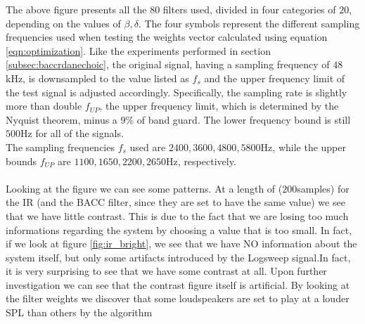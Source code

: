 The above figure presents all the $80$ filters used, divided in four categories of $20$, depending on the values of $\beta, \delta$. The four symbols represent the different sampling frequencies used when testing the weights vector calculated using equation \ref{eqn:optimization}. Like the experiments performed in section \ref{subsec:baccrdanechoic}, the original signal, having a sampling frequency of $48$kHz, is downsampled to the value listed as $f_s$ and the upper frequency limit of the test signal is adjusted accordingly. Specifically, the sampling rate is slightly more than double $f_{UP}$, the upper frequency limit, which is determined by the Nyquist theorem, minus a \tld$9\%$ of band guard. The lower frequency bound is still $500$Hz for all of the signals.
\\
The sampling frequencies $f_s$ used are $2400, 3600, 4800, 5800$Hz, while the upper bounds $f_{UP}$ are \tld$1100, 1650, 2200, 2650$Hz, respectively. 
\\
\\
Looking at the figure we can see some patterns. At a length of ($200$samples) for the IR (and the BACC filter, since they are set to have the same value) we see that we have little contrast. This is due to the fact that we are losing too much informations regarding the system by choosing a value that is too small. In fact, if we look at figure \ref{fig:ir_bright}, we see that we have NO information about the system itself, but only some artifacts introduced by the Logsweep signal.In fact, it is very surprising to see that we have some contrast at all. Upon further investigation we can see that the contrast figure itself is artificial. By looking at the filter weights we discover that some loudspeakers are set to play at a louder SPL than others by the algorithm

